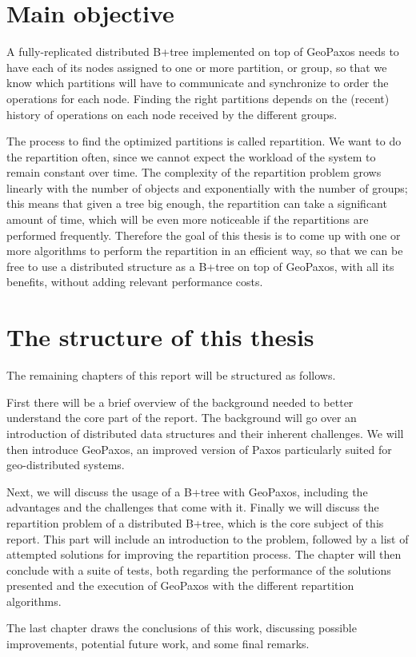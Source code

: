\section{Main objective}\label{sec:main-objective}
A fully-replicated distributed B+tree implemented on top of GeoPaxos needs to have each of its nodes assigned to one or more partition, or group, so that we know which partitions will have to communicate and synchronize to order the operations for each node. Finding the right partitions depends on the (recent) history of operations on each node received by the different groups.

The process to find the optimized partitions is called repartition. We want to do the repartition often, since we cannot expect the workload of the system to remain constant over time. The complexity of the repartition problem grows linearly with the number of objects and exponentially with the number of groups; this means that given a tree big enough, the repartition can take a significant amount of time, which will be even more noticeable if the repartitions are performed frequently. Therefore the goal of this thesis is to come up with one or more algorithms to perform the repartition in an efficient way, so that we can be free to use a distributed structure as a B+tree on top of GeoPaxos, with all its benefits, without adding relevant performance costs.

\section{The structure of this thesis}\label{the-structure-of-this-thesis}
The remaining chapters of this report will be structured as follows.

First there will be a brief overview of the background needed to better understand the core part of the report. The background will go over an introduction of distributed data structures and their inherent challenges. We will then introduce GeoPaxos\citep{geopaxos}, an improved version of Paxos particularly suited for geo-distributed systems. 

Next, we will discuss the usage of a B+tree with GeoPaxos, including the advantages and the challenges that come with it. Finally we will discuss the repartition problem of a distributed B+tree, which is the core subject of this report. This part will include an introduction to the problem, followed by a list of attempted solutions for improving the repartition process. The chapter will then conclude with a suite of tests, both regarding the performance of the solutions presented and the execution of GeoPaxos with the different repartition algorithms.

The last chapter draws the conclusions of this work, discussing possible improvements, potential future work, and some final remarks.